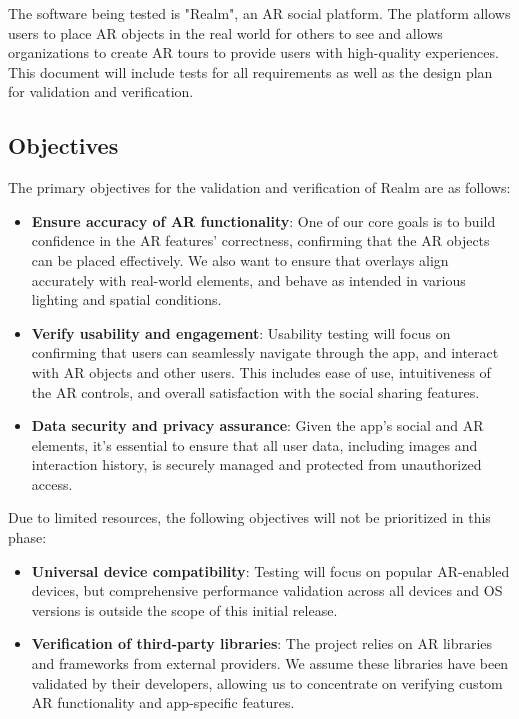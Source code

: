 \documentclass[12pt, titlepage]{article}
\begin{document}
The software being tested is "Realm", an AR social platform. The platform allows users to place AR objects in the real world for others to see and allows organizations to create AR tours to provide users with high-quality experiences. This document will include tests for all requirements as well as the design plan for validation and verification.

\subsection{Objectives}

The primary objectives for the validation and verification of Realm are as follows: \\

\begin{itemize}
  \item \textbf{Ensure accuracy of AR functionality}: One of our core goals is to build confidence in the AR features' correctness, confirming that the AR objects can be placed effectively. We also want to ensure that overlays align accurately with real-world elements, and behave as intended in various lighting and spatial conditions. \\

  \item \textbf{Verify usability and engagement}: Usability testing will focus on confirming that users can seamlessly navigate through the app, and interact with AR objects and other users. This includes ease of use, intuitiveness of the AR controls, and overall satisfaction with the social sharing features. \\

  \item \textbf{Data security and privacy assurance}: Given the app's social and AR elements, it's essential to ensure that all user data, including images and interaction history, is securely managed and protected from unauthorized access. \\
\end{itemize}

Due to limited resources, the following objectives will not be prioritized in this phase: \\

\begin{itemize}
  \item \textbf{Universal device compatibility}: Testing will focus on popular AR-enabled devices, but comprehensive performance validation across all devices and OS versions is outside the scope of this initial release. \\

  \item \textbf{Verification of third-party libraries}: The project relies on AR libraries and frameworks from external providers. We assume these libraries have been validated by their developers, allowing us to concentrate on verifying custom AR functionality and app-specific features. \\
\end{itemize}
\end{document}

